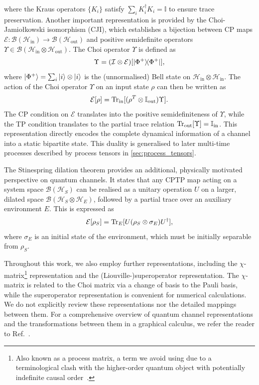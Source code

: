 where the Kraus operators \(\{K_i\}\) satisfy \(\sum_i K_i^\dagger K_i = \mathbb{I}\) to ensure trace preservation. Another important representation is provided by the Choi-Jamiołkowski isomorphism (CJI), which establishes a bijection between CP maps \(\mathcal{E}: \mathcal{B}(\mathcal{H}_{\mathrm{in}}) \to \mathcal{B}(\mathcal{H}_{\mathrm{out}})\) and positive semidefinite operators \(\Upsilon \in \mathcal{B}(\mathcal{H}_{\mathrm{in}} \otimes \mathcal{H}_{\mathrm{out}})\). The Choi operator \(\Upsilon\) is defined as
\begin{equation}
    \Upsilon = (\mathcal{I} \otimes \mathcal{E})[\ket{\Phi^+}\!\!\bra{\Phi^+}],
\end{equation}
where \(\ket{\Phi^+} = \sum_i \ket{i}\otimes \ket{i}\) is the (unnormalised) Bell state on \(\mathcal{H}_{\mathrm{in}} \otimes \mathcal{H}_{\mathrm{in}}\). The action of the Choi operator \(\Upsilon\) on an input state \(\rho\) can then be written as
\begin{equation}\label{eq:choi-rep}
    \mathcal{E}[\rho] = \mathrm{Tr}_{\mathrm{in}}[(\rho^T \otimes \mathbb{I}_{\mathrm{out}})\Upsilon].
\end{equation}
The CP condition on \(\mathcal{E}\) translates into the positive semidefiniteness of \(\Upsilon\), while the TP condition translates to the partial trace relation \(\mathrm{Tr}_{\mathrm{out}}[\Upsilon] = \mathbb{I}_{\mathrm{in}}\). This representation directly encodes the complete dynamical information of a channel into a static bipartite state. This duality is generalised to later multi-time processes described by process tensors in \cref{sec:process_tensors}.

The Stinespring dilation theorem provides an additional, physically motivated perspective on quantum channels. It states that any CPTP map acting on a system space \(\mathcal{B}(\mathcal{H}_S)\) can be realised as a unitary operation \(U\) on a larger, dilated space \(\mathcal{B}(\mathcal{H}_S \otimes \mathcal{H}_E)\), followed by a partial trace over an auxiliary environment \(E\). This is expressed as
\begin{equation}
    \mathcal{E}[\rho_S] = \mathrm{Tr}_E[U(\rho_S \otimes \sigma_E)U^\dagger],
\end{equation}
where \(\sigma_E\) is an initial state of the environment, which must be initially separable from \(\rho_S\).

Throughout this work, we also employ further representations, including the \(\chi\)-matrix\footnote{Also known as a process matrix, a term we avoid using due to a terminological clash with the higher-order quantum object with potentially indefinite causal order~\cite{oreshkovQuantumCorrelationsNo2012}.} representation and the (Liouville-)superoperator representation. The \(\chi\)-matrix is related to the Choi matrix via a change of basis to the Pauli basis, while the superoperator representation is convenient for numerical calculations. We do not explicitly review these representations nor the detailed mappings between them. For a comprehensive overview of quantum channel representations and the transformations between them in a graphical calculus, we refer the reader to Ref.~\cite{woodTensorNetworksGraphical2015}. 


